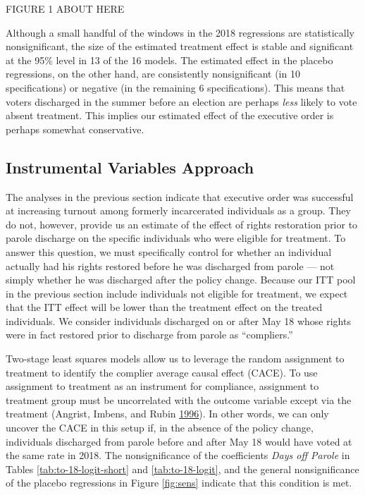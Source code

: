 \documentclass[
  12pt,
]{article}
\begin{document}
FIGURE 1 ABOUT HERE

Although a small handful of the windows in the 2018 regressions are statistically nonsignificant, the size of the estimated treatment effect is stable and significant at the 95\% level in 13 of the 16 models. The estimated effect in the placebo regressions, on the other hand, are consistently nonsignificant (in 10 specifications) or negative (in the remaining 6 specifications). This means that voters discharged in the summer before an election are perhaps \emph{less} likely to vote absent treatment. This implies our estimated effect of the executive order is perhaps somewhat conservative.

\hypertarget{instrumental-variables-approach}{%
\subsection*{Instrumental Variables Approach}\label{instrumental-variables-approach}}

The analyses in the previous section indicate that executive order was successful at increasing turnout among formerly incarcerated individuals as a group. They do not, however, provide us an estimate of the effect of rights restoration prior to parole discharge on the specific individuals who were eligible for treatment. To answer this question, we must specifically control for whether an individual actually had his rights restored before he was discharged from parole --- not simply whether he was discharged after the policy change. Because our ITT pool in the previous section include individuals not eligible for treatment, we expect that the ITT effect will be lower than the treatment effect on the treated individuals. We consider individuals discharged on or after May 18 whose rights were in fact restored prior to discharge from parole as ``compliers.''

Two-stage least squares models allow us to leverage the random assignment to treatment to identify the complier average causal effect (CACE). To use assignment to treatment as an instrument for compliance, assignment to treatment group must be uncorrelated with the outcome variable except via the treatment (Angrist, Imbens, and Rubin \protect\hyperlink{ref-Angrist1996}{1996}). In other words, we can only uncover the CACE in this setup if, in the absence of the policy change, individuals discharged from parole before and after May 18 would have voted at the same rate in 2018. The nonsignificance of the coefficients \emph{Days off Parole} in Tables \ref{tab:to-18-logit-short} and \ref{tab:to-18-logit}, and the general nonsignificance of the placebo regressions in Figure \ref{fig:sens} indicate that this condition is met.
\end{document}
